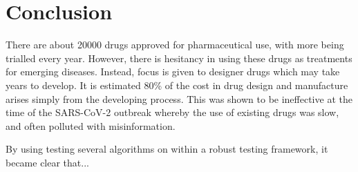 \chapter{Conclusion}


\graphicspath{{Chapter6/Figs/Vector/}{Chapter6/Figs/}}




There are about 20000 drugs approved for pharmaceutical use, with more being trialled every year. However, there is hesitancy in using these drugs as treatments for emerging diseases. Instead, focus is given to designer drugs which may take years to develop. It is estimated 80\% of the cost in drug design and manufacture arises simply from the developing process. This was shown to be ineffective at the time of the SARS-CoV-2 outbreak whereby the use of existing drugs was slow, and often polluted with misinformation.

By using testing several algorithms on within a robust testing framework, it became clear that...